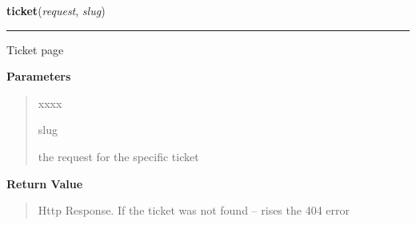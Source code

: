     \label{morbid:views:ticket}

    \vspace{0.5ex}

\hspace{.8\funcindent}\begin{boxedminipage}{\funcwidth}

    \raggedright \textbf{ticket}(\textit{request}, \textit{slug})

    \vspace{-1.5ex}

    \rule{\textwidth}{0.5\fboxrule}
\setlength{\parskip}{2ex}
    Ticket page

\setlength{\parskip}{1ex}
      \textbf{Parameters}
      \vspace{-1ex}

      \begin{quote}
        \begin{Ventry}{xxxx}

          \item[slug]

          the request for the specific ticket

        \end{Ventry}

      \end{quote}

      \textbf{Return Value}
    \vspace{-1ex}

      \begin{quote}
      Http Response. If the ticket was not found -- rises the 404 error

      \end{quote}

    \end{boxedminipage}

    \label{morbid:views:analytic}

    \vspace{0.5ex}

